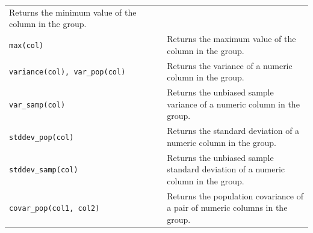 \documentclass[
]{article}
\begin{document}
\begin{longtable}[]{@{}ll@{}}
\begin{minipage}[t]{0.55\columnwidth}
Returns the minimum value of the column in the group.\strut
\end{minipage}\tabularnewline
\begin{minipage}[t]{0.39\columnwidth}\raggedright
\texttt{max(col)}\strut
\end{minipage} & \begin{minipage}[t]{0.55\columnwidth}\raggedright
Returns the maximum value of the column in the group.\strut
\end{minipage}\tabularnewline
\begin{minipage}[t]{0.39\columnwidth}\raggedright
\texttt{variance(col),\ var\_pop(col)}\strut
\end{minipage} & \begin{minipage}[t]{0.55\columnwidth}\raggedright
Returns the variance of a numeric column in the group.\strut
\end{minipage}\tabularnewline
\begin{minipage}[t]{0.39\columnwidth}\raggedright
\texttt{var\_samp(col)}\strut
\end{minipage} & \begin{minipage}[t]{0.55\columnwidth}\raggedright
Returns the unbiased sample variance of a numeric column in the
group.\strut
\end{minipage}\tabularnewline
\begin{minipage}[t]{0.39\columnwidth}\raggedright
\texttt{stddev\_pop(col)}\strut
\end{minipage} & \begin{minipage}[t]{0.55\columnwidth}\raggedright
Returns the standard deviation of a numeric column in the group.\strut
\end{minipage}\tabularnewline
\begin{minipage}[t]{0.39\columnwidth}\raggedright
\texttt{stddev\_samp(col)}\strut
\end{minipage} & \begin{minipage}[t]{0.55\columnwidth}\raggedright
Returns the unbiased sample standard deviation of a numeric column in
the group.\strut
\end{minipage}\tabularnewline
\begin{minipage}[t]{0.39\columnwidth}\raggedright
\texttt{covar\_pop(col1,\ col2)}\strut
\end{minipage} & \begin{minipage}[t]{0.55\columnwidth}\raggedright
Returns the population covariance of a pair of numeric columns in the
group.\strut
\end{minipage}\tabularnewline

\end{longtable}
\end{document}
